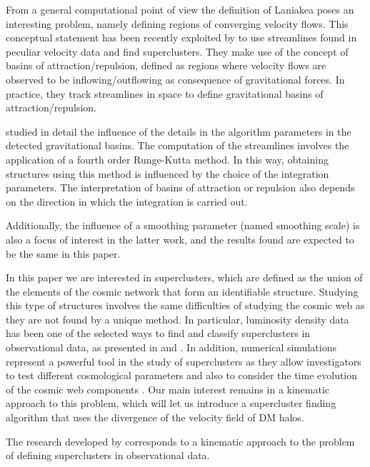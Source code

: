 \documentclass[usenatbib]{mnras}
\begin{document}
From a general computational point of view the definition of Laniakea poses
an interesting problem, namely defining regions of converging velocity
flows.
This conceptual statement has been recently exploited by \cite{Dupuy_2019} 
to use streamlines found in peculiar velocity data and find
superclusters. 
They make use of the concept of basins of attraction/repulsion, defined as
regions where velocity flows are observed to be inflowing/outflowing
as consequence of gravitational forces. 
In practice, they track streamlines in space to define gravitational
basins of attraction/repulsion.   

\cite{Dupuy_2020} studied in detail the influence of the details in
the algorithm parameters in the detected gravitational basins. 
The computation of the streamlines involves the application of a
fourth order Runge-Kutta method. 
In this way, obtaining structures using this method is influenced by
the choice of the integration parameters. 
The interpretation of basins of attraction or repulsion
also depends on the direction in which the integration is carried
out. 

Additionally, the
influence of a smoothing parameter (named smoothing scale) is also a
focus of interest in the latter work, and the results found are
expected to be the same in this paper. 

In this paper we are interested in superclusters, which are defined as
the union of the elements of the cosmic network that form an
identifiable structure. 
Studying this type of structures involves the
same difficulties of studying the cosmic web as they are not found by
a unique method. In particular, luminosity density data has been one
of the selected ways to find and classify superclusters in
observational data, as presented in \cite{Lietzen_2016} and
\cite{Bagchi_2017}. In addition, numerical simulations represent a
powerful tool in the study of superclusters as they allow investigators to
test different cosmological parameters and also to consider the time
evolution of the cosmic web components
\citep{Einasto_2019,einasto2020evolution}. Our main interest remains
in a kinematic approach to this problem, which will let us introduce a
supercluster finding algorithm that uses the divergence of the
velocity field of DM halos. 



The research developed by \cite{2014Natur.513...71T} corresponds to a kinematic approach to the problem of defining superclusters in observational data. 
\end{document}
